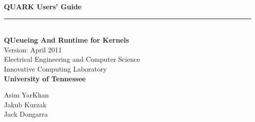 \documentclass[11pt,letterpaper]{report}
\begin{document}

\thispagestyle{empty}
\begin{flushright}
\sf
\noindent
{\Huge\textbf{QUARK Users' Guide}}
\rule[-1ex]{\textwidth}{5pt}\\[2.5ex]
{\Large\textbf{QUeueing And Runtime for Kernels}} \\
\vspace{0.1in}
{\Large{Version: April 2011}} \\ %
\vspace{0.5in}
\noindent
Electrical Engineering and Computer Science \\
Innovative Computing Laboratory \\
\textbf{University of Tennessee}


\vspace{2.0in}
\noindent
Asim YarKhan \\
Jakub Kurzak \\
Jack Dongarra \\
\end{flushright}


\tableofcontents
\setlength\parindent{0in}
\setlength\parskip{0.1in}
\sloppy
\rm


\end{document}
